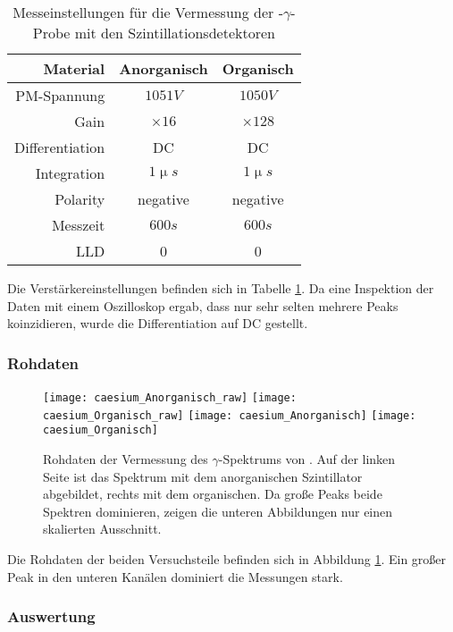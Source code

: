 \documentclass{../Misc/MontavonLaTeX/Montavon}
\newcommand{\halfwidth}{0.48\textwidth}
\begin{document}
\begin{table}[htbp]
\centering
\begin{tabular}{|r||c|c|}
\hline
Material & Anorganisch & Organisch \\
\hline \hline
PM-Spannung & $1051 \unit{V}$ & $1050 \unit{V}$ \\
\hline 
Gain & $\times 16$ & $\times 128$ \\
Differentiation & DC & DC \\
Integration & $1 \unit{\upmu s}$ & $1 \unit{\upmu s}$ \\
Polarity & negative & negative \\
\hline
Messzeit & $600 \unit{s}$ & $600 \unit{s}$ \\
LLD & 0 & 0 \\
\hline
\end{tabular}
\caption{Messeinstellungen für die Vermessung der -$\gamma$-Probe mit den Szintillationsdetektoren}
\label{tbl:caesium_einstellungen}
\end{table}

Die Verstärkereinstellungen befinden sich in Tabelle \ref{tbl:caesium_einstellungen}. Da eine Inspektion der Daten mit einem Oszilloskop ergab, dass nur sehr selten mehrere Peaks koinzidieren, wurde die Differentiation auf DC gestellt.

\subsubsection{Rohdaten}
\begin{figure}[htbp]
\centering
\texttt{[image: caesium\_Anorganisch\_raw]}
\texttt{[image: caesium\_Organisch\_raw]}
\texttt{[image: caesium\_Anorganisch]}
\texttt{[image: caesium\_Organisch]}
\caption{Rohdaten der Vermessung des $\gamma$-Spektrums von . Auf der linken Seite ist das Spektrum mit dem anorganischen Szintillator abgebildet, rechts mit dem organischen. Da große Peaks beide Spektren dominieren, zeigen die unteren Abbildungen nur einen skalierten Ausschnitt.}
\label{fig:caesium_raw}
\end{figure}

Die Rohdaten der beiden Versuchsteile befinden sich in Abbildung \ref{fig:caesium_raw}. Ein großer Peak in den unteren Kanälen dominiert die Messungen stark. 

\subsubsection{Auswertung}
\end{document}
